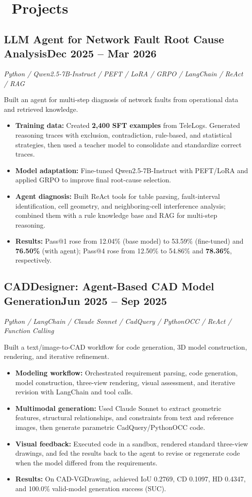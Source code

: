 \documentclass[10pt,a4paper]{article}
\newcommand{\datedsubsection}[2]{\subsection{\textbf{#1}\hfill\normalfont\small #2}}
\newcommand{\tech}[1]{{\fontsize{9.3}{12}\selectfont\itshape #1\par}\vspace{1pt}}
\begin{document}
\section{\faCode\ Projects}
\datedsubsection{LLM Agent for Network Fault Root Cause Analysis}{Dec 2025 -- Mar 2026}
\tech{Python / Qwen2.5-7B-Instruct / PEFT / LoRA / GRPO / LangChain / ReAct / RAG}
Built an agent for multi-step diagnosis of network faults from operational data and retrieved knowledge.
\begin{itemize}
  \item \textbf{Training data:} Created \textbf{2,400 SFT examples} from TeleLogs. Generated reasoning traces with exclusion, contradiction, rule-based, and statistical strategies, then used a teacher model to consolidate and standardize correct traces.
  \item \textbf{Model adaptation:} Fine-tuned Qwen2.5-7B-Instruct with PEFT/LoRA and applied GRPO to improve final root-cause selection.
  \item \textbf{Agent diagnosis:} Built ReAct tools for table parsing, fault-interval identification, cell geometry, and neighboring-cell interference analysis; combined them with a rule knowledge base and RAG for multi-step reasoning.
  \item \textbf{Results:} Pass@1 rose from 12.04\% (base model) to 53.59\% (fine-tuned) and \textbf{76.50\%} (with agent); Pass@4 rose from 12.50\% to 54.86\% and \textbf{78.36\%}, respectively.
\end{itemize}
\vspace{3pt}
\datedsubsection{CADDesigner: Agent-Based CAD Model Generation}{Jun 2025 -- Sep 2025}
\tech{Python / LangChain / Claude Sonnet / CadQuery / PythonOCC / ReAct / Function Calling}
Built a text/image-to-CAD workflow for code generation, 3D model construction, rendering, and iterative refinement.
\begin{itemize}
  \item \textbf{Modeling workflow:} Orchestrated requirement parsing, code generation, model construction, three-view rendering, visual assessment, and iterative revision with LangChain and tool calls.
  \item \textbf{Multimodal generation:} Used Claude Sonnet to extract geometric features, structural relationships, and constraints from text and reference images, then generate parametric CadQuery/PythonOCC code.
  \item \textbf{Visual feedback:} Executed code in a sandbox, rendered standard three-view drawings, and fed the results back to the agent to revise or regenerate code when the model differed from the requirements.
  \item \textbf{Results:} On CAD-VGDrawing, achieved IoU 0.2769, CD 0.1097, HD 0.4347, and 100.0\% valid-model generation success (SUC).
\end{itemize}
\end{document}
